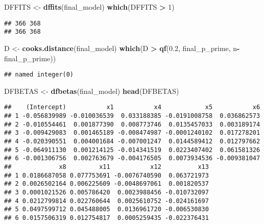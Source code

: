 \documentclass[]{article}
\newenvironment{Shaded}{\begin{snugshade}}{\end{snugshade}}
\newcommand{\KeywordTok}[1]{\textcolor[rgb]{0.13,0.29,0.53}{\textbf{#1}}}
\newcommand{\DecValTok}[1]{\textcolor[rgb]{0.00,0.00,0.81}{#1}}
\newcommand{\FloatTok}[1]{\textcolor[rgb]{0.00,0.00,0.81}{#1}}
\newcommand{\StringTok}[1]{\textcolor[rgb]{0.31,0.60,0.02}{#1}}
\newcommand{\OperatorTok}[1]{\textcolor[rgb]{0.81,0.36,0.00}{\textbf{#1}}}
\newcommand{\NormalTok}[1]{#1}
\begin{document}
\begin{Shaded}
\begin{Highlighting}[]
\NormalTok{DFFITS <-}\StringTok{ }\KeywordTok{dffits}\NormalTok{(final_model)}
\KeywordTok{which}\NormalTok{(DFFITS }\OperatorTok{>}\StringTok{ }\DecValTok{1}\NormalTok{)}
\end{Highlighting}
\end{Shaded}

\begin{verbatim}
## 366 368 
## 366 368
\end{verbatim}

\begin{Shaded}
\begin{Highlighting}[]
\NormalTok{D <-}\StringTok{ }\KeywordTok{cooks.distance}\NormalTok{(final_model)}
\KeywordTok{which}\NormalTok{(D }\OperatorTok{>}\StringTok{ }\KeywordTok{qf}\NormalTok{(}\FloatTok{0.2}\NormalTok{, final_p_prime, n}\OperatorTok{-}\NormalTok{final_p_prime))}
\end{Highlighting}
\end{Shaded}

\begin{verbatim}
## named integer(0)
\end{verbatim}

\begin{Shaded}
\begin{Highlighting}[]
\NormalTok{DFBETAS <-}\StringTok{ }\KeywordTok{dfbetas}\NormalTok{(final_model)}
\KeywordTok{head}\NormalTok{(DFBETAS)}
\end{Highlighting}
\end{Shaded}

\begin{verbatim}
##    (Intercept)           x1           x4            x5           x6
## 1 -0.056839989 -0.010036539  0.033188385 -0.0191008758  0.036862573
## 2 -0.010554461  0.001877390  0.008773746  0.0135457033  0.003189174
## 3 -0.009429083  0.001465189 -0.008474987 -0.0001240102  0.017278201
## 4 -0.020390551  0.004001684 -0.007001247  0.0144589412  0.012797662
## 5 -0.064911130  0.001214125 -0.014341519  0.0223407402  0.061581326
## 6 -0.001306756  0.002763679 -0.004176505  0.0073934536 -0.009381047
##             x8         x11           x12          x13
## 1 0.0186687058 0.077753691 -0.0076740590  0.063721973
## 2 0.0026502164 0.006225609 -0.0048697061  0.001820537
## 3 0.0001021526 0.005786420  0.0023988456 -0.010732097
## 4 0.0212799814 0.022760644  0.0025610752 -0.024161697
## 5 0.0497599712 0.045488005  0.0136961720 -0.006530830
## 6 0.0157506319 0.012754817  0.0005259435 -0.022376431
\end{verbatim}
\end{document}
